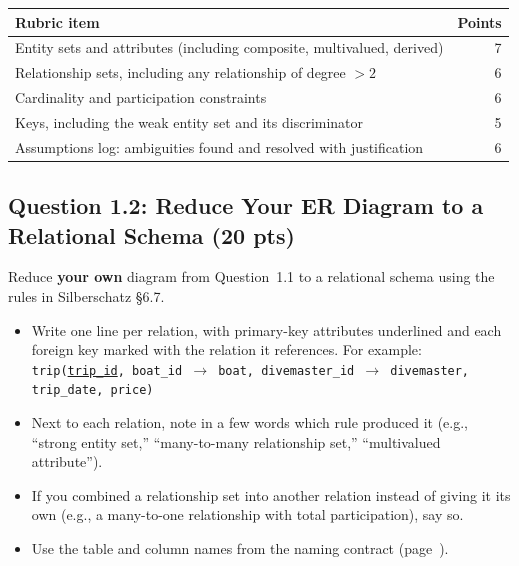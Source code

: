 \documentclass[11pt]{article}
\newcommand{\pts}[1]{\hfill\textbf{(#1 pts)}}
\newcommand{\code}[1]{\texttt{#1}}
\begin{document}
\begin{center}
\begin{tabular}{@{}lr@{}}
\toprule
\textbf{Rubric item} & \textbf{Points} \\
\midrule
Entity sets and attributes (including composite, multivalued, derived) & 7 \\
Relationship sets, including any relationship of degree $>2$ & 6 \\
Cardinality and participation constraints & 6 \\
Keys, including the weak entity set and its discriminator & 5 \\
Assumptions log: ambiguities found and resolved with justification & 6 \\
\bottomrule
\end{tabular}
\end{center}


\FloatBarrier
\subsection*{Question 1.2: Reduce Your ER Diagram to a Relational Schema \pts{20}}

Reduce \textbf{your own} diagram from Question~1.1 to a relational schema using the rules in
Silberschatz \S6.7.

\begin{itemize}
  \item Write one line per relation, with primary-key attributes underlined and each foreign key
    marked with the relation it references. For example:\\[2pt]
    \hspace*{1em}\code{trip(\underline{trip\_id}, boat\_id $\rightarrow$ boat, divemaster\_id $\rightarrow$ divemaster, trip\_date, price)}
  \item Next to each relation, note in a few words which rule produced it (e.g., ``strong entity set,''
    ``many-to-many relationship set,'' ``multivalued attribute'').
  \item If you combined a relationship set into another relation instead of giving it its own
    (e.g., a many-to-one relationship with total participation), say so.
  \item Use the table and column names from the naming contract (page~\pageref{sec:contract}).
\end{itemize}
\end{document}
